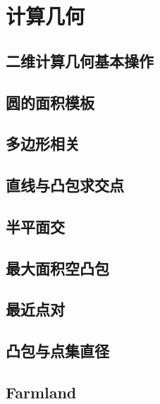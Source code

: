 \documentclass[landscape, twocolumn, 8pt, a4paper, twoside]{extarticle}
\begin{document}
\tableofcontents
\newpage
\section{计算几何}
  \subsection{二维计算几何基本操作}
  

  \subsection{圆的面积模板}
  

  \subsection{多边形相关}
  

  \subsection{直线与凸包求交点}
  

  \subsection{半平面交}
  

  \subsection{最大面积空凸包}
  

  \subsection{最近点对}
  

  \subsection{凸包与点集直径}
  

  \subsection{Farmland}
  
\end{document}
